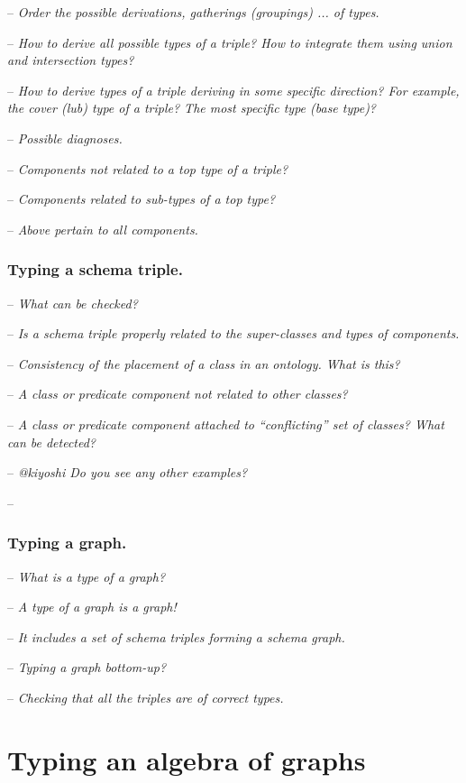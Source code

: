 \documentclass[runningheads]{llncs}
\newcommand{\nl}{\hfill\break}
\newcommand{\notes}[1]{\noindent\begin{small}-- \emph{#1}\\\end{small}}
\begin{document}
%
%

\noindent
\notes{Order the possible derivations, gatherings (groupings) ... of types.}
\notes{How to derive all possible types of a triple? How to integrate them using union and intersection types?}
\notes{How to derive types of a triple deriving in some specific direction? For example, the cover (lub) type of a triple? The most specific type (base type)?}

\noindent
\notes{Possible diagnoses.}
\notes{Components not related to a top type of a triple?}
\notes{Components related to sub-types of a top type?}
\notes{Above pertain to all components.}


\subsubsection{Typing a schema triple.}\nl

\notes{What can be checked?}
\notes{Is a schema triple properly related to the super-classes and types of components.}
\notes{Consistency of the placement of a class in an ontology. What is this?}
\notes{A class or predicate component not related to other classes?}
\notes{A class or predicate component attached to ``conflicting'' set of classes? What can be detected?}
\notes{@kiyoshi Do you see any other examples?}
\notes{}

\subsubsection{Typing a graph.}\nl

\notes{What is a type of a graph?}
\notes{A type of a graph is a graph!}
\notes{It includes a set of schema triples forming a schema graph.}

\notes{Typing a graph bottom-up?}
\notes{Checking that all the triples are of correct types.}





\section{Typing  an algebra of graphs}
\end{document}
